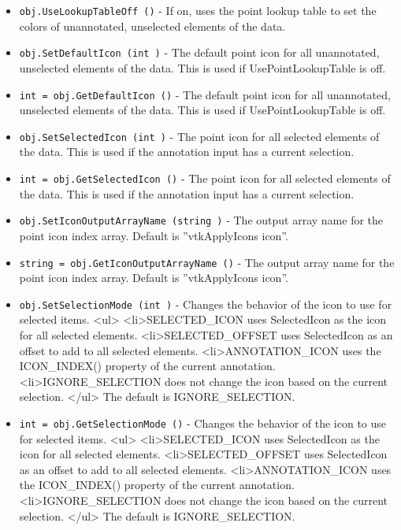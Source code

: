 \begin{itemize}
\item  \verb|obj.UseLookupTableOff ()| -  If on, uses the point lookup table to set the colors of unannotated,
 unselected elements of the data.

\item  \verb|obj.SetDefaultIcon (int )| -  The default point icon for all unannotated, unselected elements
 of the data. This is used if UsePointLookupTable is off.

\item  \verb|int = obj.GetDefaultIcon ()| -  The default point icon for all unannotated, unselected elements
 of the data. This is used if UsePointLookupTable is off.

\item  \verb|obj.SetSelectedIcon (int )| -  The point icon for all selected elements of the data.
 This is used if the annotation input has a current selection.

\item  \verb|int = obj.GetSelectedIcon ()| -  The point icon for all selected elements of the data.
 This is used if the annotation input has a current selection.

\item  \verb|obj.SetIconOutputArrayName (string )| -  The output array name for the point icon index array.
 Default is ''vtkApplyIcons icon''.

\item  \verb|string = obj.GetIconOutputArrayName ()| -  The output array name for the point icon index array.
 Default is ''vtkApplyIcons icon''.

\item  \verb|obj.SetSelectionMode (int )| -  Changes the behavior of the icon to use for selected items.
 <ul>
 <li>SELECTED\_ICON uses SelectedIcon as the icon for all selected elements.
 <li>SELECTED\_OFFSET uses SelectedIcon as an offset to add to all selected elements.
 <li>ANNOTATION\_ICON uses the ICON\_INDEX() property of the current annotation.
 <li>IGNORE\_SELECTION does not change the icon based on the current selection.
 </ul>
 The default is IGNORE\_SELECTION.

\item  \verb|int = obj.GetSelectionMode ()| -  Changes the behavior of the icon to use for selected items.
 <ul>
 <li>SELECTED\_ICON uses SelectedIcon as the icon for all selected elements.
 <li>SELECTED\_OFFSET uses SelectedIcon as an offset to add to all selected elements.
 <li>ANNOTATION\_ICON uses the ICON\_INDEX() property of the current annotation.
 <li>IGNORE\_SELECTION does not change the icon based on the current selection.
 </ul>
 The default is IGNORE\_SELECTION.


\end{itemize}
